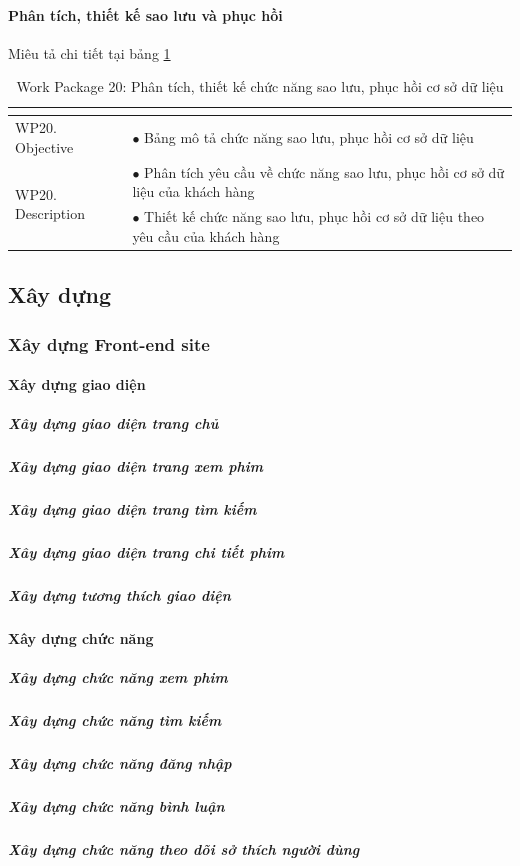 \documentclass[a4paper]{book}
\begin{document}
\paragraph{Phân tích, thiết kế sao lưu và phục hồi} Miêu tả chi tiết tại bảng \ref{table:baomat_thietke_saoluu}
\begin{table}[h!]
	\begin{center}
		\begin{tabular}{|p{4cm}|p{10cm}|}
			\hline
			\multicolumn{2}{|c|}{\cellcolor[HTML]{363636}{\color[HTML]{FFFFFF}Work package 20: Phân tích, thiết kế chức năng sao lưu, phục hồi cơ sở dữ liệu}}\\
			\hline
			\multirow{1}{*}{WP20. Objective} & $\bullet$ Bảng mô tả chức năng sao lưu, phục hồi cơ sở dữ liệu\\
			\hline
			\multirow{2}{*}{WP20. Description} & $\bullet$ Phân tích yêu cầu về chức năng sao lưu, phục hồi cơ sở dữ liệu của khách hàng \\
			& $\bullet$ Thiết kế chức năng sao lưu, phục hồi cơ sở dữ liệu theo yêu cầu của khách hàng\\
			\hline
		\end{tabular}
		\caption{Work Package 20: Phân tích, thiết kế chức năng sao lưu, phục hồi cơ sở dữ liệu}
		\label{table:baomat_thietke_saoluu}
	\end{center}
\end{table}
\subsection{Xây dựng}
\subsubsection{Xây dựng Front-end site}
\paragraph{Xây dựng giao diện}
\subparagraph{Xây dựng giao diện trang chủ}
\subparagraph{Xây dựng giao diện trang xem phim}
\subparagraph{Xây dựng giao diện trang tìm kiếm}
\subparagraph{Xây dựng giao diện trang chi tiết phim}
\subparagraph{Xây dựng tương thích giao diện}
\paragraph{Xây dựng chức năng}
\subparagraph{Xây dựng chức năng xem phim}
\subparagraph{Xây dựng chức năng tìm kiếm}
\subparagraph{Xây dựng chức năng đăng nhập}
\subparagraph{Xây dựng chức năng bình luận}
\subparagraph{Xây dựng chức năng theo dõi sở thích người dùng}
\end{document}
